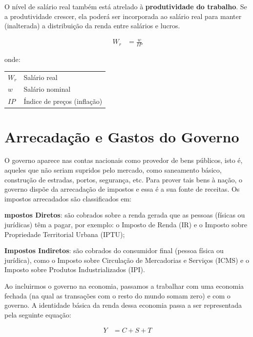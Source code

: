 \documentclass{article}\usepackage[]{graphicx}\usepackage[]{xcolor}
\makeatletter
\newenvironment{conditions}
  {\par\vspace{\abovedisplayskip}\noindent\begin{tabular}{>{$}l<{$} @{${}={}$} l}}
  {\end{tabular}\par\vspace{\belowdisplayskip}}
\makeatother
\begin{document}
O nível de salário real também está atrelado à \textbf{produtividade do trabalho}. Se a produtividade crescer, ela
poderá ser incorporada ao salário real para manter (inalterada) a distribuição da renda entre salários e lucros.

\begin{equation}\label{eq9}
\begin{split}
    W_r   &=    \frac{w}{IP}
\end{split}
\end{equation}

onde:

\begin{conditions}
W_r   &   Salário real\\
w     &   Salário nominal\\
IP    &   Índice de preços (inflação)\\
\end{conditions}

\section*{Arrecadação e Gastos do Governo}

O governo aparece nas contas nacionais como provedor de bens públicos, isto é, aqueles que não
seriam supridos pelo mercado, como saneamento básico, construção de estradas, portos, segurança, etc.
Para prover tais bens à nação, o governo dispõe da arrecadação de impostos e essa é a sua fonte de
receitas. Os impostos arrecadados são classificados em:\par

\textbf{mpostos Diretos}: são cobrados sobre a renda gerada que as pessoas (físicas ou jurídicas) têm a pagar,
por exemplo: o Imposto de Renda (IR) e o Imposto sobre Propriedade Territorial Urbana (IPTU);\par

\textbf{Impostos Indiretos}: são cobrados do consumidor final (pessoa física ou jurídica), como o Imposto sobre
Circulação de Mercadorias e Serviços (ICMS) e o Imposto sobre Produtos Industrializados (IPI).\par

Ao incluirmos o governo na economia, passamos a trabalhar com uma economia fechada (na qual as transações
com o resto do mundo somam zero) e com o governo. A identidade básica da renda dessa economia passa a ser
representada pela seguinte equação:

\begin{equation}\label{eq10}
\begin{split}
    Y   &=    C + S + T
\end{split}
\end{equation}
\end{document}
